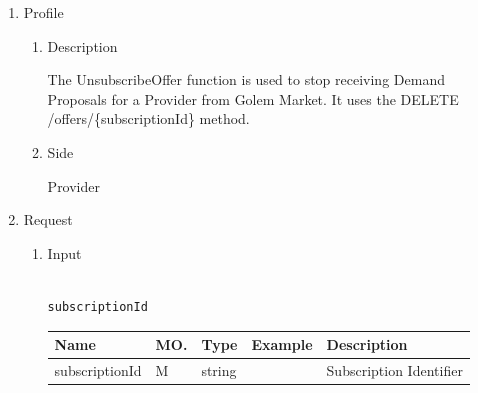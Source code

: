 \begin{enumerate}

\item Profile

\begin{enumerate}

\item Description

The UnsubscribeOffer function is used to stop receiving Demand Proposals for a Provider from Golem Market. 
It uses the DELETE /offers/\{subscriptionId\} method.

\item Side

Provider

\end{enumerate}

\item Request

\begin{enumerate}

\item Input

\begin{tcolorbox}[boxrule=0pt, frame empty]
\begin{verbatim}

subscriptionId

\end{verbatim}
\end{tcolorbox}





\begin{center}
\begin{tabular}{|p{3cm}|l|p{3cm}|p{3cm}|p{4cm}|} 
\hline
\rowcolor{lightgray}	Name	& MO.	& Type	& Example & 	Description \\
\hline

subscriptionId	& M	& 	string	&		&	Subscription Identifier \\ 

\hline

\end{tabular}
\end{center}


\end{enumerate}
\end{enumerate}
